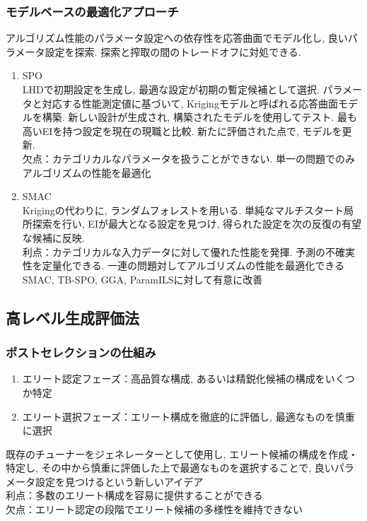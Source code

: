 \documentclass[twocolumn]{jarticle}     %
\begin{document}
\subsubsection{モデルベースの最適化アプローチ}
アルゴリズム性能のパラメータ設定への依存性を応答曲面でモデル化し, 良いパラメータ設定を探索.
探索と搾取の間のトレードオフに対処できる.

\begin{enumerate}
  \item SPO \\
  LHDで初期設定を生成し, 最適な設定が初期の暫定候補として選択.
  パラメータと対応する性能測定値に基づいて, Krigingモデルと呼ばれる応答曲面モデルを構築.
  新しい設計が生成され, 構築されたモデルを使用してテスト.
  最も高いEIを持つ設定を現在の現職と比較.
  新たに評価された点で, モデルを更新. \\
  欠点：カテゴリカルなパラメータを扱うことができない. 単一の問題でのみアルゴリズムの性能を最適化

  \item SMAC \\
  Krigingの代わりに, ランダムフォレストを用いる.
  単純なマルチスタート局所探索を行い, EIが最大となる設定を見つけ, 得られた設定を次の反復の有望な候補に反映. \\
  利点：カテゴリカルな入力データに対して優れた性能を発揮. 予測の不確実性を定量化できる. 一連の問題対してアルゴリズムの性能を最適化できる\\
  SMAC, TB-SPO, GGA, ParamILSに対して有意に改善
\end{enumerate}

\subsection{高レベル生成評価法}
\subsubsection{ポストセレクションの仕組み}
\begin{enumerate}
  \item エリート認定フェーズ：高品質な構成, あるいは精鋭化候補の構成をいくつか特定
  \item エリート選択フェーズ：エリート構成を徹底的に評価し, 最適なものを慎重に選択
\end{enumerate}

既存のチューナーをジェネレーターとして使用し, エリート候補の構成を作成・特定し, その中から慎重に評価した上で最適なものを選択することで, 良いパラメータ設定を見つけるという新しいアイデア\\
利点：多数のエリート構成を容易に提供することができる\\
欠点：エリート認定の段階でエリート候補の多様性を維持できない
\end{document}
